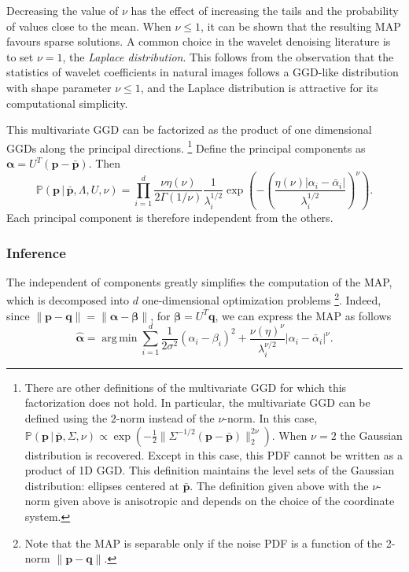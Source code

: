 \documentclass{ipol}
\newcommand{\ma}[1]{\boldsymbol{#1}}
\DeclareMathOperator*{\argmin}{arg\,min}
\begin{document}
Decreasing the value of $\nu$ has the effect of 
increasing the tails and the probability of values close to the mean. When
$\nu \leqslant 1$, it can be shown that the resulting MAP favours sparse
solutions. A common choice in the wavelet denoising literature is to set $\nu = 1$, 
the \emph{Laplace distribution}. This follows from the observation that the
statistics of wavelet coefficients in natural images follows a GGD-like
distribution with shape parameter $\nu \leqslant 1$, and the Laplace
distribution is attractive for its computational simplicity.

This multivariate GGD can be factorized 
as the product of one dimensional GGDs along the principal directions.%
\footnote{There are other definitions of the multivariate GGD for which this
factorization does not hold. In particular, the multivariate GGD can be defined using the
$2$-norm instead of the $\nu$-norm. In this case, $\mathbb P(\ma
p\,|\,\bar{\ma p}, \Sigma,\nu) \propto \exp\left(-\frac12\|\Sigma^{-1/2}(\ma p
- \bar{\ma p}) \|_2^{2\nu}\right)$. When $\nu = 2$ the Gaussian distribution is recovered. Except in this case,
this PDF cannot be written as a product of 1D GGD. 
This definition maintains the level sets of the Gaussian distribution: ellipses
centered at $\bar{\ma p}$.  The definition given above with the $\nu$-norm
given above is anisotropic and depends on the choice of the
coordinate system.}
Define the principal components as $\ma \alpha = U^T(\ma p - \bar{\ma p})$. Then
\begin{equation}
	\mathbb P(\ma p\,|\,\bar{\ma p}, \Lambda, U, \nu) = \prod_{i =1}^d
	\frac{\nu\eta(\nu)}{2\Gamma(1/\nu)}\frac1{\lambda_i^{1/2}}
	\exp\left(-\left(\frac{\eta(\nu)|\alpha_i - \bar{\alpha}_i|}{\lambda_i^{1/2}}\right)^{\nu} \right).
	\label{eeq:ggd-family-factorized}
\end{equation}
Each principal component is therefore independent from the others. 

\subsubsection{Inference}

The independent of components
greatly simplifies the computation of the MAP, which is decomposed into $d$
one-dimensional optimization problems%
\footnote{Note that the MAP is separable only if the noise PDF is a function of
the 2-norm $\|\ma p - \ma q\|$.}.
Indeed, since $\|\ma p - \ma q\| = \|\ma \alpha - \ma \beta\|$, for $\ma \beta =
U^T\ma q$, we can express the MAP as follows
\[\hat{\ma \alpha} = \argmin \sum_{i = 1}^d\frac1{2\sigma^2} (\alpha_i -
\beta_i)^2 + \frac{\nu(\eta)^{\nu}}{\lambda_i^{\nu/2}}{|\alpha_i - \bar{\alpha}_i|^\nu}.\]
\end{document}

